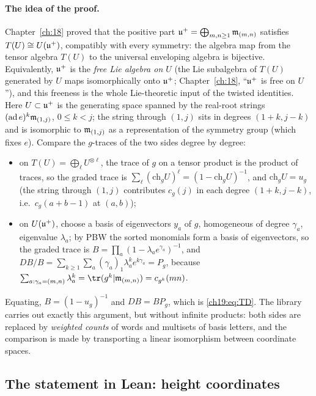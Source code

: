 \paragraph{The idea of the proof.}  Chapter~\ref{ch:18} proved that the positive part $\mathfrak{u}^+=\bigoplus_{m,n\ge1}\mathfrak{m}_{(m,n)}$
satisfies $T(U)\cong U(\mathfrak{u}^+)$, compatibly with every symmetry: the algebra map from the tensor algebra $T(U)$ to the
universal enveloping algebra is bijective.  Equivalently, $\mathfrak{u}^+$ is the \emph{free Lie algebra on $U$} (the Lie subalgebra of
$T(U)$ generated by $U$ maps isomorphically onto $\mathfrak{u}^+$; Chapter~\ref{ch:18}, ``$\mathfrak{u}^+$ is free on $U$''), and this
freeness is the whole Lie-theoretic input of the twisted identities.  Here $U\subset\mathfrak{u}^+$ is the generating space spanned
by the real-root strings $(\mathrm{ad}\,e)^k\mathfrak{m}_{(1,j)}$, $0\le k<j$; the string through $(1,j)$ sits in degrees
$(1+k,j-k)$ and is isomorphic to $\mathfrak{m}_{(1,j)}$ as a representation of the symmetry group (which fixes $e$).  Compare the
$g$-traces of the two sides degree by degree:
\begin{itemize}
\item on $T(U)=\bigoplus_\ell U^{\otimes\ell}$, the trace of $g$ on a tensor product is the product of traces, so the
  graded trace is $\sum_\ell(\mathrm{ch}_gU)^\ell=(1-\mathrm{ch}_gU)^{-1}$, and $\mathrm{ch}_gU=u_g$ (the string through $(1,j)$
  contributes $c_g(j)$ in each degree $(1+k,j-k)$, i.e.\ $c_g(a+b-1)$ at $(a,b)$);
\item on $U(\mathfrak{u}^+)$, choose a basis of eigenvectors $y_a$ of $g$, homogeneous of degree $\gamma_a$, eigenvalue
  $\lambda_a$; by PBW the sorted monomials form a basis of eigenvectors, so the graded trace is
  $B=\prod_a(1-\lambda_ae^{\gamma_a})^{-1}$, and $DB/B=\sum_{k\ge1}\sum_a(\gamma_a)_1\lambda_a^ke^{k\gamma_a}=P_g$, because
  $\sum_{a:\gamma_a=(m,n)}\lambda_a^k=\tr(g^k|\chnineteenm_{(m,n)})=c_{g^k}(mn)$.
\end{itemize}
Equating, $B=(1-u_g)^{-1}$ and $DB=BP_g$, which is \eqref{ch19:eq:TD}.  The library carries out exactly this argument,
but without infinite products: both sides are replaced by \emph{weighted counts} of words and multisets of basis
letters, and the comparison is made by transporting a linear isomorphism between coordinate spaces.

\subsection{The statement in Lean: height coordinates}

